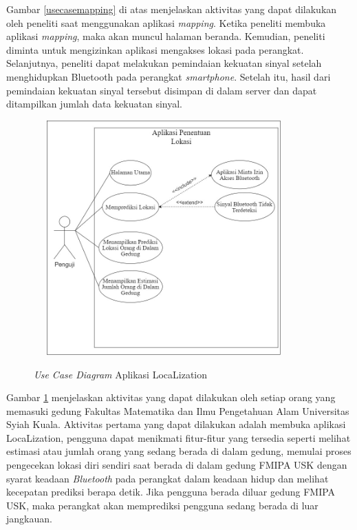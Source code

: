 
\par Gambar \ref{usecasemapping} di atas menjelaskan aktivitas yang dapat dilakukan oleh peneliti saat menggunakan aplikasi \textit{mapping}. Ketika peneliti membuka aplikasi \textit{mapping}, maka akan muncul halaman beranda. Kemudian, peneliti diminta untuk mengizinkan aplikasi mengakses lokasi pada perangkat. Selanjutnya, peneliti dapat melakukan pemindaian kekuatan sinyal setelah menghidupkan Bluetooth pada perangkat \textit{smartphone}. Setelah itu, hasil dari pemindaian kekuatan sinyal tersebut disimpan di dalam server dan dapat ditampilkan jumlah data kekuatan sinyal.
\fancyhf{}
\fancyfoot[R]{\thepage}
\begin{figure}[H]
	\center
	\shadowbox
	{\includegraphics [width=10cm, height=9cm]{gambar/penentuanlokasi}}
	\caption{\textit{Use Case Diagram} Aplikasi LocaLization}
	\label{usecasedosen}
\end{figure}

\par Gambar \ref{usecasedosen} menjelaskan aktivitas yang dapat dilakukan oleh setiap orang yang memasuki gedung Fakultas Matematika dan Ilmu Pengetahuan Alam Universitas Syiah Kuala. Aktivitas pertama yang dapat dilakukan adalah membuka aplikasi LocaLization, pengguna dapat menikmati fitur-fitur yang tersedia seperti melihat estimasi atau jumlah orang yang sedang berada di dalam gedung, memulai proses pengecekan lokasi diri sendiri saat berada di dalam gedung FMIPA USK dengan syarat keadaan \textit{Bluetooth} pada perangkat dalam keadaan hidup dan melihat kecepatan prediksi berapa detik. Jika pengguna berada diluar gedung FMIPA USK, maka perangkat akan memprediksi pengguna sedang berada di luar jangkauan.

